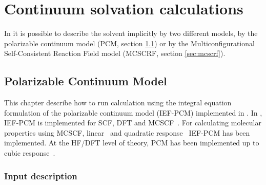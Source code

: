 \chapter{Continuum solvation calculations}\label{ch:solvent}

In {\dalton} it is possible to describe the solvent implicitly by two
different models, by the polarizable continuum model (PCM, section
\ref{sec:pcm}) or by the Multiconfigurational Self-Consistent Reaction
Field model (MCSCRF, section \ref{sec:mcscrf}).

\section{Polarizable Continuum Model}
\label{sec:pcm}

This chapter describe how to run calculation using the integral
equation formulation of the polarizable continuum model (IEF-PCM)
implemented in {\dalton}. In {\dalton}, IEF-PCM is
implemented for SCF, DFT and MCSCF~\cite{cammi02}. For calculating
molecular properties using MCSCF, linear~\cite{cammi03} and quadratic
response~\cite{frediani05} IEF-PCM has been implemented. At the HF/DFT
level of theory, PCM has been implemented up to cubic
response~\cite{ferrighi07}.

\begin{center}
\end{center}

\subsection{Input description}\label{sec:pcminp}

